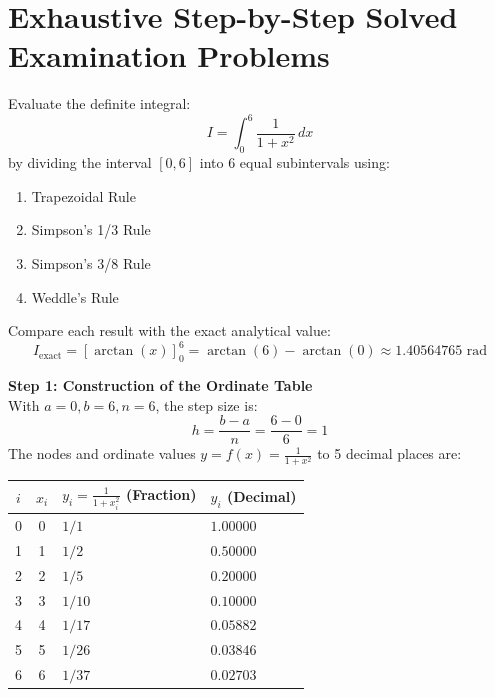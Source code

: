 \section{Exhaustive Step-by-Step Solved Examination Problems}
\label{sec:quadrature_solved_problems}

\begin{examplebox}
Evaluate the definite integral:
\begin{equation}
    I = \int_{0}^{6} \frac{1}{1 + x^2} \, dx
\end{equation}
by dividing the interval $[0, 6]$ into $6$ equal subintervals using:
\begin{enumerate}[label=(\roman*),noitemsep]
    \item Trapezoidal Rule
    \item Simpson's 1/3 Rule
    \item Simpson's 3/8 Rule
    \item Weddle's Rule
\end{enumerate}
Compare each result with the exact analytical value:
\begin{equation}
    I_{\text{exact}} = \left[ \arctan(x) \right]_0^6 = \arctan(6) - \arctan(0) \approx 1.40564765 \text{ rad}
\end{equation}

\textbf{Step 1: Construction of the Ordinate Table} \\
With $a = 0, b = 6, n = 6$, the step size is:
\begin{equation}
    h = \frac{b - a}{n} = \frac{6 - 0}{6} = 1
\end{equation}
The nodes and ordinate values $y = f(x) = \frac{1}{1 + x^2}$ to 5 decimal places are:
\begin{center}
\renewcommand{\arraystretch}{1.3}
\begin{tabular}{|c|c|l|l|}
\hline
$i$ & $x_i$ & $y_i = \frac{1}{1 + x_i^2}$ (Fraction) & $y_i$ (Decimal) \\ \hline
0 & 0 & $1 / 1$ & $1.00000$ \\
1 & 1 & $1 / 2$ & $0.50000$ \\
2 & 2 & $1 / 5$ & $0.20000$ \\
3 & 3 & $1 / 10$ & $0.10000$ \\
4 & 4 & $1 / 17$ & $0.05882$ \\
5 & 5 & $1 / 26$ & $0.03846$ \\
6 & 6 & $1 / 37$ & $0.02703$ \\ \hline
\end{tabular}
\end{center}
\end{examplebox}

